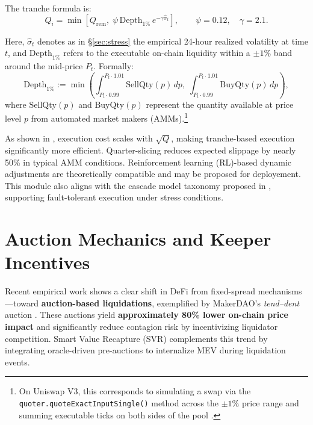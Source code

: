 \documentclass[11pt]{article}
\newcommand{\secref}[1]{\hyperref[#1]{\S\ref*{#1}}}
\begin{document}
The tranche formula is:
\begin{equation}\label{eq:tranche}
Q_i = \min \left[ Q_{\text{rem}},\;
                  \psi\,\text{Depth}_{1\%}\,e^{-\gamma \widehat{\sigma}_t} \right],
\qquad \psi = 0.12,\quad \gamma = 2.1.
\end{equation}

Here, \( \widehat{\sigma}_t \) denotes as in \secref{sec:stress} the empirical 24-hour realized volatility at time \( t \), and \( \text{Depth}_{1\%} \) refers to the executable on-chain liquidity within a \(\pm 1\%\) band around the mid-price \( P_t \). Formally:
\[
\text{Depth}_{1\%} := \min \left(
\int_{P_t \cdot 0.99}^{P_t \cdot 1.01} \text{SellQty}(p)\,dp,\;
\int_{P_t \cdot 0.99}^{P_t \cdot 1.01} \text{BuyQty}(p)\,dp
\right),
\]
where \( \text{SellQty}(p) \) and \( \text{BuyQty}(p) \) represent the quantity available at price level \( p \) from automated market makers (AMMs).\footnote{On Uniswap V3, this corresponds to simulating a swap via the \texttt{quoter.quoteExactInputSingle()} method across the \(\pm1\%\) price range and summing executable ticks on both sides of the pool \parencite{uniswap-v3-quoter-docs}.}

As shown in \textcite{almgren2000optimal}, execution cost scales with \( \sqrt{Q} \), making tranche-based execution significantly more efficient. Quarter-slicing reduces expected slippage by nearly 50\% in typical AMM conditions.  
Reinforcement learning (RL)-based dynamic adjustments \parencite{zhang2023adaptive} are theoretically compatible and may be proposed for deployement.  
This module also aligns with the cascade model taxonomy proposed in \textcite{zhao2025reliability}, supporting fault-tolerant execution under stress conditions.




\section{Auction Mechanics and Keeper Incentives}
\label{sec:auction}

Recent empirical work shows a clear shift in DeFi from fixed-spread mechanisms \parencite{aave-liquidation-docs, compound-liquidation-docs}—toward \textbf{auction-based liquidations}, exemplified by MakerDAO’s \textit{tend–dent} auction \parencite{makerdao-auctions-docs}. These auctions yield \textbf{approximately 80\% lower on-chain price impact} and significantly reduce contagion risk by incentivizing liquidator competition. Smart Value Recapture (SVR) \parencite{chainlink2025svr} complements this trend by integrating oracle-driven pre-auctions to internalize MEV during liquidation events.
\end{document}
